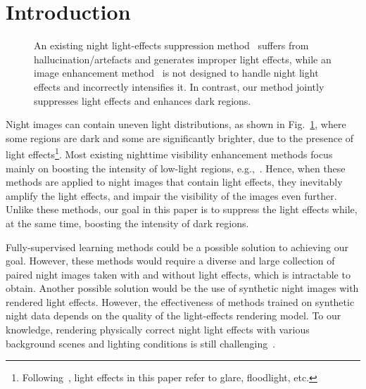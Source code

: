 \documentclass[runningheads]{llncs}
\begin{document}
\section{Introduction}
\label{sec:intr}
\begin{figure}[t]
	\captionsetup[subfloat]{labelformat=empty}
	\captionsetup[subfloat]{farskip=2pt}
	\hfill
	\hfill
	\hfill
	\hfill
	\caption{An existing night light-effects suppression method~\cite{sharma2021nighttime} suffers from hallucination/artefacts and generates improper light effects, while an image enhancement method~\cite{jiang2021enlightengan} is not designed to handle night light effects and incorrectly intensifies it. In contrast, our method jointly suppresses light effects and enhances dark regions.}
	\label{figure_intro}
\end{figure}

Night images can contain uneven light distributions, as shown in Fig.~\ref{figure_intro}, where some regions are dark and some are significantly brighter, due to the presence of light effects\footnote{Following~\cite{sharma2021nighttime}, light effects in this paper refer to glare, floodlight, etc.}.
Most existing nighttime visibility enhancement methods focus mainly on boosting the intensity of low-light regions, e.g.,~\cite{guo2016lime,chen2018retinex,wang2019underexposed,guo2020zero,jiang2021enlightengan}.
Hence, when these methods are applied to night images that contain light effects, they inevitably amplify the light effects, and impair the visibility of the images even further. Unlike these methods, our goal in this paper is to suppress the light effects while, at the same time, boosting the intensity of dark regions.

Fully-supervised learning methods could be a possible solution to achieving our goal. However, these methods would require a diverse and large collection of paired night images taken with and without light effects, which is intractable to obtain. 
Another possible solution would be the use of synthetic night images with rendered light effects. However, the effectiveness of methods trained on synthetic night data depends on the quality of the light-effects rendering model. To our knowledge, rendering physically correct night light effects with various background scenes and lighting conditions is still challenging~\cite{wu2021train}.
 
\end{document}

